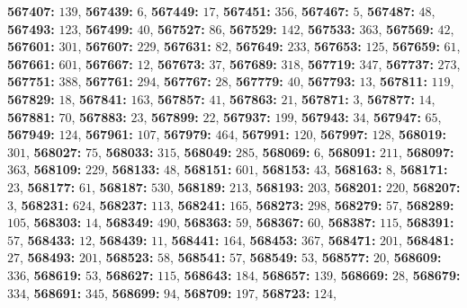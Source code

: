 \textsf{\bfseries 567407:} $139$, \textsf{\bfseries 567439:} $6$, \textsf{\bfseries 567449:} $17$, \textsf{\bfseries 567451:} $356$, \textsf{\bfseries 567467:} $5$, \textsf{\bfseries 567487:} $48$, \textsf{\bfseries 567493:} $123$, \textsf{\bfseries 567499:} $40$, \textsf{\bfseries 567527:} $86$, \textsf{\bfseries 567529:} $142$, \textsf{\bfseries 567533:} $363$, \textsf{\bfseries 567569:} $42$, \textsf{\bfseries 567601:} $301$, \textsf{\bfseries 567607:} $229$, \textsf{\bfseries 567631:} $82$, \textsf{\bfseries 567649:} $233$, \textsf{\bfseries 567653:} $125$, \textsf{\bfseries 567659:} $61$, \textsf{\bfseries 567661:} $601$, \textsf{\bfseries 567667:} $12$, \textsf{\bfseries 567673:} $37$, \textsf{\bfseries 567689:} $318$, \textsf{\bfseries 567719:} $347$, \textsf{\bfseries 567737:} $273$, \textsf{\bfseries 567751:} $388$, \textsf{\bfseries 567761:} $294$, \textsf{\bfseries 567767:} $28$, \textsf{\bfseries 567779:} $40$, \textsf{\bfseries 567793:} $13$, \textsf{\bfseries 567811:} $119$, \textsf{\bfseries 567829:} $18$, \textsf{\bfseries 567841:} $163$, \textsf{\bfseries 567857:} $41$, \textsf{\bfseries 567863:} $21$, \textsf{\bfseries 567871:} $3$, \textsf{\bfseries 567877:} $14$, \textsf{\bfseries 567881:} $70$, \textsf{\bfseries 567883:} $23$, \textsf{\bfseries 567899:} $22$, \textsf{\bfseries 567937:} $199$, \textsf{\bfseries 567943:} $34$, \textsf{\bfseries 567947:} $65$, \textsf{\bfseries 567949:} $124$, \textsf{\bfseries 567961:} $107$, \textsf{\bfseries 567979:} $464$, \textsf{\bfseries 567991:} $120$, \textsf{\bfseries 567997:} $128$, \textsf{\bfseries 568019:} $301$, \textsf{\bfseries 568027:} $75$, \textsf{\bfseries 568033:} $315$, \textsf{\bfseries 568049:} $285$, \textsf{\bfseries 568069:} $6$, \textsf{\bfseries 568091:} $211$, \textsf{\bfseries 568097:} $363$, \textsf{\bfseries 568109:} $229$, \textsf{\bfseries 568133:} $48$, \textsf{\bfseries 568151:} $601$, \textsf{\bfseries 568153:} $43$, \textsf{\bfseries 568163:} $8$, \textsf{\bfseries 568171:} $23$, \textsf{\bfseries 568177:} $61$, \textsf{\bfseries 568187:} $530$, \textsf{\bfseries 568189:} $213$, \textsf{\bfseries 568193:} $203$, \textsf{\bfseries 568201:} $220$, \textsf{\bfseries 568207:} $3$, \textsf{\bfseries 568231:} $624$, \textsf{\bfseries 568237:} $113$, \textsf{\bfseries 568241:} $165$, \textsf{\bfseries 568273:} $298$, \textsf{\bfseries 568279:} $57$, \textsf{\bfseries 568289:} $105$, \textsf{\bfseries 568303:} $14$, \textsf{\bfseries 568349:} $490$, \textsf{\bfseries 568363:} $59$, \textsf{\bfseries 568367:} $60$, \textsf{\bfseries 568387:} $115$, \textsf{\bfseries 568391:} $57$, \textsf{\bfseries 568433:} $12$, \textsf{\bfseries 568439:} $11$, \textsf{\bfseries 568441:} $164$, \textsf{\bfseries 568453:} $367$, \textsf{\bfseries 568471:} $201$, \textsf{\bfseries 568481:} $27$, \textsf{\bfseries 568493:} $201$, \textsf{\bfseries 568523:} $58$, \textsf{\bfseries 568541:} $57$, \textsf{\bfseries 568549:} $53$, \textsf{\bfseries 568577:} $20$, \textsf{\bfseries 568609:} $336$, \textsf{\bfseries 568619:} $53$, \textsf{\bfseries 568627:} $115$, \textsf{\bfseries 568643:} $184$, \textsf{\bfseries 568657:} $139$, \textsf{\bfseries 568669:} $28$, \textsf{\bfseries 568679:} $334$, \textsf{\bfseries 568691:} $345$, \textsf{\bfseries 568699:} $94$, \textsf{\bfseries 568709:} $197$, \textsf{\bfseries 568723:} $124$, 
